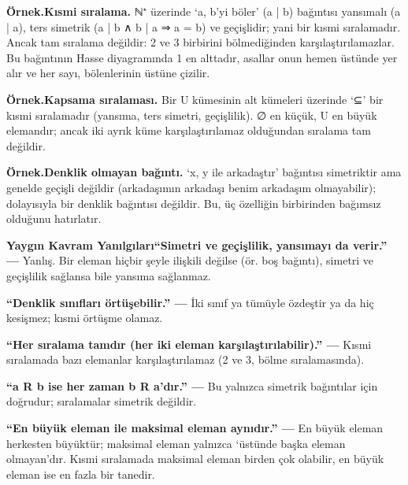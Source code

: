 \begin{tcolorbox}[bookbox,colback=cEx]\textbf{\textsf{\textcolor{cAcc}{Örnek.}}}\quad \textbf{Kısmi sıralama. }ℕ⁺ üzerinde ‘a, b’yi böler’ (a | b) bağıntısı yansımalı (a | a), ters simetrik (a | b ∧ b | a ⇒ a = b) ve geçişlidir; yani bir kısmi sıralamadır. Ancak tam sıralama değildir: 2 ve 3 birbirini bölmediğinden karşılaştırılamazlar. Bu bağıntının Hasse diyagramında 1 en alttadır, asallar onun hemen üstünde yer alır ve her sayı, bölenlerinin üstüne çizilir.\end{tcolorbox}

\begin{tcolorbox}[bookbox,colback=cEx]\textbf{\textsf{\textcolor{cAcc}{Örnek.}}}\quad \textbf{Kapsama sıralaması. }Bir U kümesinin alt kümeleri üzerinde ‘⊆’ bir kısmi sıralamadır (yansıma, ters simetri, geçişlilik). ∅ en küçük, U en büyük elemandır; ancak iki ayrık küme karşılaştırılamaz olduğundan sıralama tam değildir.\end{tcolorbox}

\begin{tcolorbox}[bookbox,colback=cEx]\textbf{\textsf{\textcolor{cAcc}{Örnek.}}}\quad \textbf{Denklik olmayan bağıntı. }‘x, y ile arkadaştır’ bağıntısı simetriktir ama genelde geçişli değildir (arkadaşımın arkadaşı benim arkadaşım olmayabilir); dolayısıyla bir denklik bağıntısı değildir. Bu, üç özelliğin birbirinden bağımsız olduğunu hatırlatır.\end{tcolorbox}

\begin{tcolorbox}[bookbox,colback=cMis]\textbf{\textsf{\textcolor{cAcc}{Yaygın Kavram Yanılgıları}}}\quad \textbf{“Simetri ve geçişlilik, yansımayı da verir.” — }Yanlış. Bir eleman hiçbir şeyle ilişkili değilse (ör. boş bağıntı), simetri ve geçişlilik sağlansa bile yansıma sağlanmaz.\par\medskip{}\textbf{“Denklik sınıfları örtüşebilir.” — }İki sınıf ya tümüyle özdeştir ya da hiç kesişmez; kısmi örtüşme olamaz.\par\medskip{}\textbf{“Her sıralama tamdır (her iki eleman karşılaştırılabilir).” — }Kısmi sıralamada bazı elemanlar karşılaştırılamaz (2 ve 3, bölme sıralamasında).\par\medskip{}\textbf{“a R b ise her zaman b R a’dır.” — }Bu yalnızca simetrik bağıntılar için doğrudur; sıralamalar simetrik değildir.\par\medskip{}\textbf{“En büyük eleman ile maksimal eleman aynıdır.” — }En büyük eleman herkesten büyüktür; maksimal eleman yalnızca ‘üstünde başka eleman olmayan’dır. Kısmi sıralamada maksimal eleman birden çok olabilir, en büyük eleman ise en fazla bir tanedir.\end{tcolorbox}

